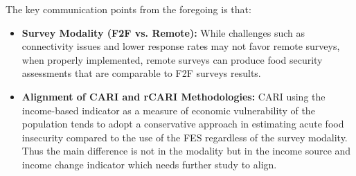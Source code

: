 \documentclass[11pt,harvard]{article}
\begin{document}
	The key communication points from the foregoing is that:
	\begin{itemize}[left=2.5em]
		\item \textbf{Survey Modality (F2F vs. Remote):} While challenges such as connectivity issues and lower response rates may not favor remote surveys, when properly implemented, remote surveys can produce food security assessments that are comparable to F2F surveys results. 
		\item \textbf{Alignment of CARI and rCARI Methodologies:} CARI using the income-based indicator as a measure of economic vulnerability of the population tends to adopt a conservative approach in estimating acute food insecurity compared to the use of the FES regardless of the survey modality. Thus the main difference is not in the modality but in the income source and income change indicator which needs further study to align.
	\end{itemize}
	
	
\end{document}
